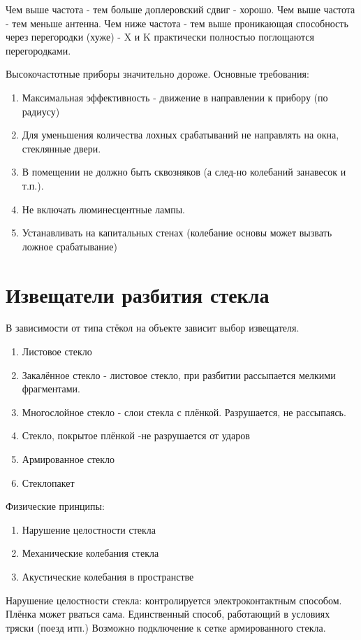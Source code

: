\documentclass[a4paper,12pt]{report}
\begin{document}
	Чем выше частота - тем больше доплеровский сдвиг - хорошо.
	Чем выше частота - тем меньше антенна.
	Чем ниже частота - тем выше проникающая способность через перегородки (хуже) - X и K практически полностью поглощаются перегородками.

	Высокочастотные приборы значительно дороже.
	Основные требования:
	\begin{enumerate}
	\item	Максимальная эффективность - движение в направлении к прибору (по радиусу)
	\item	Для уменьшения количества лохных срабатываний не направлять на окна, стеклянные двери.
	\item	В помещении не должно быть сквозняков (а след-но колебаний занавесок и т.п.).
	\item	Не включать люминесцентные лампы.
	\item	Устанавливать на капитальных стенах (колебание основы может вызвать ложное срабатывание)
	\end{enumerate}

	\section{Извещатели разбития стекла}
	В зависимости от типа стёкол на объекте зависит выбор извещателя.
	\begin{enumerate}
	\item	Листовое стекло
	\item	Закалённое стекло - листовое стекло, при разбитии рассыпается мелкими фрагментами.
	\item	Многослойное стекло - слои стекла с плёнкой. Разрушается, не рассыпаясь.
	\item	Стекло, покрытое плёнкой -не разрушается от ударов
	\item	Армированное стекло
	\item	Стеклопакет
	\end{enumerate}

	Физические принципы:
	\begin{enumerate}
	\item	Нарушение целостности стекла
	\item	Механические колебания стекла
	\item	Акустические колебания в пространстве
	\end{enumerate}

	Нарушение целостности стекла: контролируется электроконтактным способом. Плёнка может рваться сама. Единственный способ, работающий в условиях тряски (поезд итп.)
	Возможно подключение к сетке армированного стекла.
\end{document}
